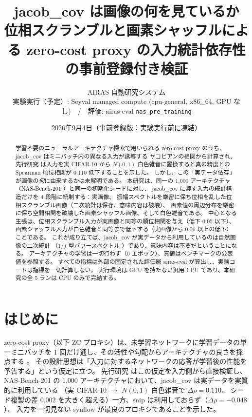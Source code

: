 \documentclass[11pt]{article}
\title{jacob\_cov は画像の何を見ているか\\
\large 位相スクランブルと画素シャッフルによる zero-cost proxy の入力統計依存性の事前登録付き検証}
\author{AIRAS 自動研究システム\\
\small 実験実行（予定）: Seyval managed compute (cpu-general, x86\_64, GPU なし)\ \ /\ \ 評価: airas-eval \texttt{nas\_pre\_training}}
\date{2026年9月4日（事前登録版：実験実行前に凍結）}
\providecommand{\unverified}[1]{#1}
\begin{document}
\maketitle

\begin{abstract}
学習不要のニューラルアーキテクチャ探索で用いられる zero-cost proxy のうち、
jacob\_cov \cite{mellor2021naswot,abdelfattah2021zerocost} はミニバッチ内の異なる入力が誘導する
ヤコビアンの相関から計算され、先行研究 \cite{airas20260903zcproxy} は入力を実 CIFAR-10 から
$N(0,1)$ 白色雑音に置換すると真の精度との Spearman 順位相関が \unverified{0.110} 低下することを示した。
しかし、この「実データ依存」が画像の\emph{何}に由来するかは未解明である。
本研究は、同一の 1{,}000 アーキテクチャ（NAS-Bench-201 \cite{dong2020nasbench201}）と同一の初期化シードに対し、
jacob\_cov に渡す入力の統計構造だけを 4 段階に統制する：実画像、
振幅スペクトルを厳密に保ち位相を乱した位相スクランブル画像（二次統計は保存、意味内容は破壊）、
画素値の周辺分布を厳密に保ち空間相関を破壊した画素シャッフル画像、そして白色雑音である。
中心となる主張は、位相スクランブル入力が実画像と同等の順位相関を与え（低下 0.05 以下）、
画素シャッフル入力が白色雑音と同等まで低下する（実画像から 0.06 以上の低下）ことである。
これが成り立てば、jacob\_cov が実データから利用しているのは自然画像の二次統計
（$1/f$ 型パワースペクトル \cite{vanderschaaf1996power}）であり、意味内容は不要だということになる。
アーキテクチャの学習は一切行わず（0 エポック）、真値はベンチマークの公表値を参照する。
すべての指標は外部の固定された評価層 airas-eval が算出し、実験コードは指標を一切計算しない。
実行環境は GPU を持たない汎用 CPU であり、本研究の全 5 ランは CPU のみで完結する。
\end{abstract}

\section{はじめに}

zero-cost proxy（以下 ZC プロキシ）は、未学習ネットワークに学習データの単一ミニバッチを
1 回だけ通し、その活性や勾配からアーキテクチャの良さを採点する \cite{abdelfattah2021zerocost,mellor2021naswot}。
その設計思想は「入力に対するネットワークの応答が学習後の性能を予告する」という仮定に立つ。
先行研究 \cite{airas20260903zcproxy} はこの仮定を入力側から直接検証し、
NAS-Bench-201 の 1{,}000 アーキテクチャにおいて、jacob\_cov は実データを実質的に利用している
（実 CIFAR-10 $\to$ $N(0,1)$ 白色雑音で $\Delta\rho = \unverified{0.110}$、
シード複製の差 \unverified{0.002} を大きく超える）一方、snip は利用しておらず（$\Delta\rho = \unverified{-0.048}$）、
入力を一切見ない synflow が最良のプロキシであることを示した。
\end{document}
